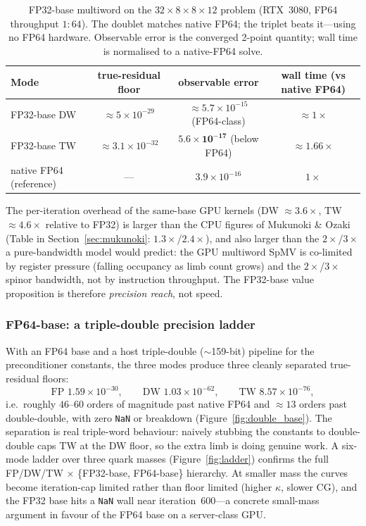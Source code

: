 \documentclass[12pt,a4paper]{article}
\begin{document}
\begin{table}[H]
\centering
\caption{FP32-base multiword on the $32\times8\times8\times12$ problem
         (RTX~3080, FP64 throughput $1\!:\!64$). The doublet matches native FP64;
         the triplet beats it---using no FP64 hardware. Observable error is the
         converged 2-point quantity; wall time is normalised to a native-FP64
         solve.}
\label{tab:fp32base}
\begin{tabular}{lccc}
\toprule
Mode & true-residual floor & observable error & wall time (vs native FP64) \\
\midrule
FP32-base DW & $\approx 5\times10^{-29}$ & $\approx 5.7\times10^{-15}$ (FP64-class) & $\approx 1\times$ \\
FP32-base TW & $\approx 3.1\times10^{-32}$ & $\mathbf{5.6\times10^{-17}}$ (below FP64) & $\approx 1.66\times$ \\
\midrule
native FP64 (reference) & --- & $3.9\times10^{-16}$ & $1\times$ \\
\bottomrule
\end{tabular}
\end{table}
The per-iteration overhead of the same-base GPU kernels (DW $\approx 3.6\times$,
TW $\approx 4.6\times$ relative to FP32) is larger than the CPU figures of
Mukunoki \& Ozaki (Table in Section~\ref{sec:mukunoki}: $1.3\times$/$2.4\times$),
and also larger than the $2\times$/$3\times$ a pure-bandwidth model would
predict: the GPU multiword SpMV is co-limited by register pressure (falling
occupancy as limb count grows) and the $2\times$/$3\times$ spinor bandwidth, not
by instruction throughput. The FP32-base value proposition is therefore
\emph{precision reach}, not speed.

\subsubsection{FP64-base: a triple-double precision ladder}

With an FP64 base and a host triple-double ($\sim$159-bit) pipeline for the
preconditioner constants, the three modes produce three cleanly separated
true-residual floors:
\begin{equation}
  \text{FP } 1.59\times10^{-30}, \qquad
  \text{DW } 1.03\times10^{-62}, \qquad
  \text{TW } 8.57\times10^{-76},
\end{equation}
i.e.\ roughly $46$--$60$ orders of magnitude past native FP64 and $\approx 13$
orders past double-double, with zero \texttt{NaN} or breakdown
(Figure~\ref{fig:double_base}). The separation is real triple-word behaviour:
naively stubbing the constants to double-double caps TW at the DW floor, so the
extra limb is doing genuine work. A six-mode ladder over three quark masses
(Figure~\ref{fig:ladder}) confirms the full FP/DW/TW $\times$ \{FP32-base,
FP64-base\} hierarchy. At smaller mass the curves become iteration-cap limited
rather than floor limited (higher $\kappa$, slower CG), and the FP32 base hits a
\texttt{NaN} wall near iteration~600---a concrete small-mass argument in favour
of the FP64 base on a server-class GPU.
\end{document}

